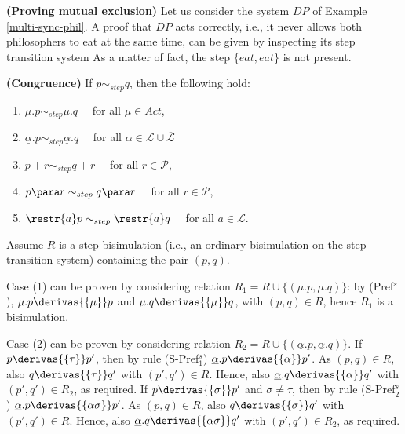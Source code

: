 %

\begin{example} {\bf (Proving mutual exclusion)} Let us consider the system $DP$ of Example \ref{multi-sync-phil}. 
A proof that $DP$ acts correctly, i.e., it never allows both philosophers to eat at the same time, can be given by
inspecting its step transition system 
As a matter of fact, the step $\{eat, eat\}$ is not present.
\fine
\end{example}

\begin{theorem}\label{cong-step}{\bf (Congruence)}
If $p \sim_{step} q$, then the following hold:
\begin{enumerate}
\item  $\mu.p \sim_{step} \mu.q \quad$ for all $\mu \in Act$,
\item $\underline{\alpha}.p \sim_{step} \underline{\alpha}.q \quad$ for all $\alpha \in \mathcal{L}\cup\overline{\mathcal{L}}$
\item $p + r \sim_{step} q + r \quad $ for all  $r \in \mathcal{P}$,
\item $p \para r \sim_{step} q \para r \quad  $ for all  $r \in \mathcal{P}$,
\item $\restr{a}p \sim_{step} \restr{a}q \quad$ for all $a \in \mathcal{L}$.
\end{enumerate}

\proof
Assume $R$ is a step bisimulation (i.e., an ordinary bisimulation on the step transition system)
containing the pair $(p, q)$.

Case (1) can be proven by considering relation $R_1 = R \cup \{(\mu.p, \mu.q)\}$: by (Pref$^s$), 
$\mu.p \derivas{\{\mu\}} p$ and $\mu.q \derivas{\{\mu\}} q$, with $(p, q) \in R$, hence $R_1$ is a bisimulation.

Case (2) can be proven by considering relation $R_2 = R \cup \{(\underline\alpha.p, \underline\alpha.q)\}$. 
If $p \derivas{\{\tau\}} p'$, then by rule (S-Pref$_1^s$) $\underline\alpha.p \derivas{\{\alpha\}} p'$.
As $(p, q) \in R$, also $q \derivas{\{\tau\}} q'$ with $(p', q') \in R$. Hence, also $\underline\alpha.q \derivas{\{\alpha\}} q'$
with $(p', q') \in R_2$, as required. If $p \derivas{\{\sigma\}} p'$ and $\sigma \neq \tau$, then by rule (S-Pref$_2^s$) 
$\underline\alpha.p \derivas{\{\alpha\sigma\}} p'$. As $(p, q) \in R$, also $q \derivas{\{\sigma\}} q'$ with $(p', q') \in R$.
Hence, also $\underline\alpha.q \derivas{\{\alpha\sigma\}} q'$ with $(p', q') \in R_2$, as required. 


\end{theorem}
